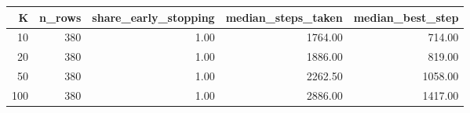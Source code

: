 \begin{tabular}{rrrrr}
\toprule
K & n_rows & share_early_stopping & median_steps_taken & median_best_step \\
\midrule
10 & 380 & 1.00 & 1764.00 & 714.00 \\
20 & 380 & 1.00 & 1886.00 & 819.00 \\
50 & 380 & 1.00 & 2262.50 & 1058.00 \\
100 & 380 & 1.00 & 2886.00 & 1417.00 \\
\bottomrule
\end{tabular}
